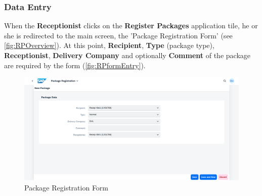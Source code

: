 \subsubsection{Data Entry}

When the \textbf{Receptionist} clicks on the \textbf{Register Packages} application tile, he or she is redirected to the main screen, the 'Package Registration Form' (see \autoref{fig:RPOverview}). At this point, \textbf{Recipient}, \textbf{Type} (package type), \textbf{Receptionist}, \textbf{Delivery Company} and optionally \textbf{Comment} of the package are required by the form (\autoref{fig:RPformEntry}).

\begin{figure}[htb!]
	\centering
	\includegraphics[width=0.95\linewidth]{images/user_doc/registration/overview.png}
	\caption{Package Registration Form}
	\label{fig:RPOverview}
\end{figure}


